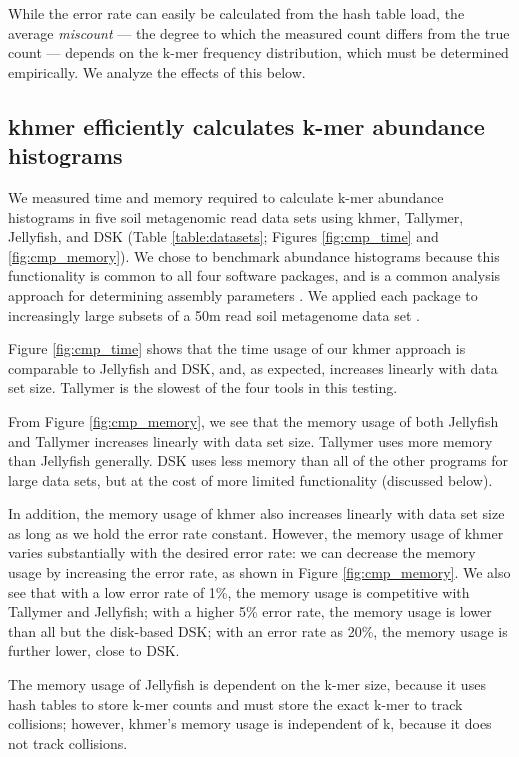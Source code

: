 \documentclass[10pt]{article}
\begin{document}
While the error rate can easily be calculated from the hash
table load, the average {\em miscount} --- the degree to which the measured count
differs from the true count --- depends on the k-mer frequency
distribution, which must be determined empirically.  We analyze the
effects of this below.

\subsection*{khmer efficiently calculates k-mer abundance histograms}

We measured time and memory required to calculate k-mer abundance
histograms in five soil metagenomic read data sets using khmer,
Tallymer, Jellyfish, and DSK (Table \ref{table:datasets}; Figures \ref{fig:cmp_time} and
\ref{fig:cmp_memory}).  We chose to benchmark abundance histograms because
this functionality is common to all four software packages, and is a
common analysis approach for determining assembly parameters \cite{Chikhi2013}.
We applied each package to increasingly large subsets of a 50m read soil
metagenome data set \cite{Howe2012}.

Figure \ref{fig:cmp_time} shows that the time usage of our khmer approach
is comparable to Jellyfish and DSK, and, as expected, increases linearly
with data set size. Tallymer is the slowest of the four tools in this testing.

From Figure \ref{fig:cmp_memory}, we see that the memory usage of both
Jellyfish and Tallymer increases linearly with data set size. Tallymer uses more 
memory than Jellyfish generally.  DSK uses less memory
than all of the other programs for large data sets, but at the cost
of more limited functionality (discussed below).

In addition, the memory usage of khmer also increases linearly with
data set size as long as we hold the error rate constant.  However,
the memory usage of khmer varies substantially with the desired error
rate: we can decrease the memory usage by increasing the
error rate, as shown in Figure \ref{fig:cmp_memory}.  We also
see that with a low error rate of 1\%, the
memory usage is competitive with Tallymer and Jellyfish; with a higher 5\%
error rate, the memory usage is lower than all but the
disk-based DSK; with an error rate as 20\%, the memory usage is further lower,
close to DSK.

The memory usage of Jellyfish is dependent on the k-mer
size, because it uses hash tables to store k-mer counts and must store
the exact k-mer to track collisions; however, khmer's memory
usage is independent of k, because it does not track collisions.
\end{document}

